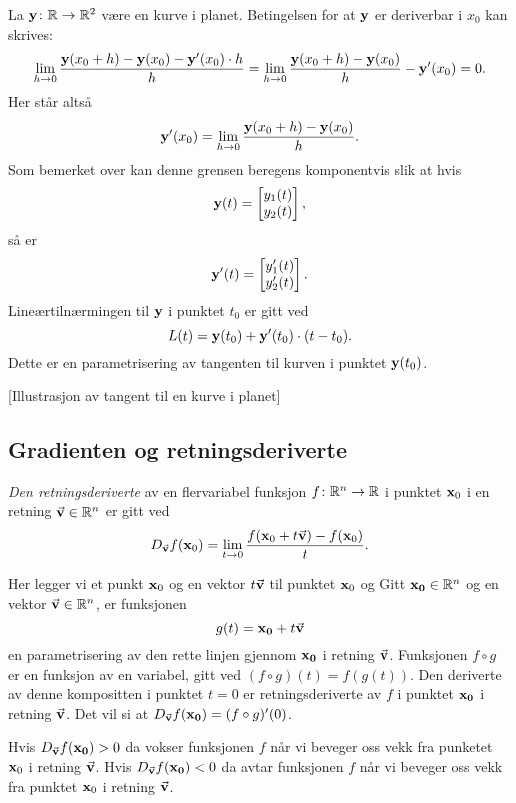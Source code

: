 \begin{eksempel}
  La $\mathbf{y} \colon \mathbb{R} \to \mathbb{R}^2$ være en kurve i planet. Betingelsen for at
  $\mathbf{y}$ er deriverbar i $x_0$  kan skrives:
  $$\lim_{h\to 0} \frac{\mathbf{y}(x_0+h) - \mathbf{y}(x_0) - \mathbf{y}'(x_0) \cdot h}{h} =
  \lim_{h\to 0} \frac{\mathbf{y}(x_0+h) - \mathbf{y}(x_0)}{h} - \mathbf{y}'(x_0) = 0.$$
  Her står altså 
  $$\mathbf{y}'(x_0) = \lim_{h\to 0} \frac{\mathbf{y}(x_0+h) - \mathbf{y}(x_0)}{h}.$$
  Som bemerket over kan denne grensen beregens komponentvis slik at hvis 
  $$\mathbf{y}(t) =
  \begin{bmatrix} y_1(t) \\ y_2(t) \end{bmatrix},$$ så er 
  $$\mathbf{y}'(t) =
  \begin{bmatrix} y_1'(t) \\ y_2'(t) \end{bmatrix}.$$
  Lineærtilnærmingen til $\mathbf{y}$ i punktet $t_0$ er gitt ved
  $$L(t) = \mathbf{y}(t_0) + \mathbf{y}'(t_0) \cdot (t - t_0).$$
  Dette er en parametrisering av tangenten til kurven i punktet $\mathbf{y}(t_0)$.
\end{eksempel}
[Illustrasjon av tangent til en kurve i planet]
\subsection{Gradienten og retningsderiverte}
\begin{definisjon}
  {\em Den retningsderiverte} av en flervariabel funksjon $f \colon \mathbb{R}^n \to
  \mathbb{R}$ i punktet $\mathbf{x}_0$ i en retning $\vec{\mathbf{v}} \in \mathbb{R}^n$ er gitt ved
  $$D_{\vec{\mathbf{v}}} f(\mathbf{x}_0) = \lim_{t\to 0} \frac{f(\mathbf{x}_0 + t\vec{\mathbf{v}}) - f(\mathbf{x}_0)}{t}.$$
\end{definisjon}

Her legger vi et punkt $\mathbf{x}_0$ og en vektor $t \vec{\mathbf{v}}$ til punktet $\mathbf{x}_0$ og
Gitt $\mathbf{x_0} \in \mathbb{R}^n$ og en vektor $\vec{\mathbf{v}} \in \mathbb{R}^n$, er funksjonen 
$$g(t) = \mathbf{x_0} + t\vec{\mathbf{v}}$$
en parametrisering av den rette linjen gjennom $\mathbf{x_0}$ i retning $\vec{\mathbf{v}}$.
Funksjonen $f \circ g$ er en funksjon av en variabel, gitt ved $(f \circ g)(t) = f(g(t))$.
Den deriverte av denne kompositten
i punktet $t=0$ er retningsderiverte av $f$ i punktet $\mathbf{x_0}$ i retning
$\vec{\mathbf{v}}$. Det vil si at
$D_{\vec{\mathbf{v}}} f(\mathbf{x_0}) = (f \circ g)'(0)$.

Hvis $D_{\vec{\mathbf{v}}} f(\mathbf{x_0}) > 0$ da vokser funksjonen $f$ når vi beveger oss
vekk fra punketet $\mathbf{x}_0$ i retning $\vec{\mathbf{v}}$. Hvis $D_{\vec{\mathbf{v}}} f(\mathbf{x_0}) < 0$ da
avtar funksjonen $f$ når vi beveger oss vekk fra punktet $\mathbf{x}_0$ i retning $\vec{\mathbf{v}}$.

